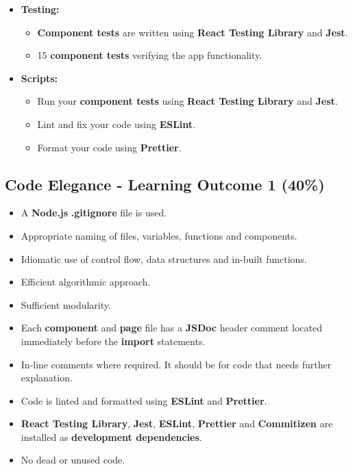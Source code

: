 \documentclass{article}
\begin{document}
\begin{itemize}
\item \textbf{Testing:}
\begin{itemize}
	\item \textbf{Component tests} are written using \textbf{React Testing Library} and \textbf{Jest}.
	\item 15 \textbf{component tests} verifying the app functionality.
\end{itemize}

\item \textbf{Scripts:}
\begin{itemize}
	\item Run your \textbf{component tests} using \textbf{React Testing Library} and \textbf{Jest}.
	\item Lint and fix your code using \textbf{ESLint}.
	\item Format your code using \textbf{Prettier}.
\end{itemize}
\end{itemize}

\subsection*{Code Elegance - Learning Outcome 1 (40\%)}
\begin{itemize}
	\item A \textbf{Node.js} \textbf{.gitignore} file is used.
	\item Appropriate naming of files, variables, functions and components.
	\item Idiomatic use of control flow, data structures and in-built functions.
	\item Efficient algorithmic approach.
	\item Sufficient modularity.
	\item Each \textbf{component} and \textbf{page} file has a \textbf{JSDoc} header comment located immediately before the \textbf{import} statements.
	\item In-line comments where required. It should be for code that needs further explanation.
	\item Code is linted and formatted using \textbf{ESLint} and \textbf{Prettier}.
	\item \textbf{React Testing Library}, \textbf{Jest}, \textbf{ESLint}, \textbf{Prettier} and \textbf{Commitizen} are installed as \textbf{development dependencies}.	
	\item No dead or unused code.
\end{itemize}
\end{document}
